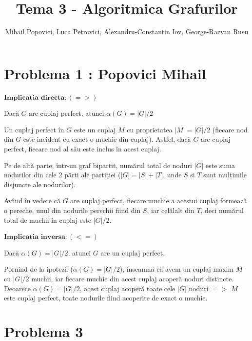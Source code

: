 \documentclass{article}
\title{Tema 3 - Algoritmica Grafurilor}
\author{Mihail Popovici, Luca Petrovici, Alexandru-Constantin Iov, George-Razvan Rusu}
\begin{document}
\maketitle

\section*{\fontsize{20}{50}\selectfont Problema 1 : Popovici Mihail}

{\fontsize{14}{16}\selectfont 
$\mathbf{Implicatia}$ $\mathbf{directa: (=>)}$ 
\par Dacă $G$ are cuplaj perfect, atunci $\alpha(G) = |G|/2$
\\
\par Un cuplaj perfect în $G$ este un cuplaj $M$ cu proprietatea $|M| = |G|/2$ (fiecare nod din $G$ este incident cu exact o muchie din cuplaj). Astfel, dacă $G$ are cuplaj perfect, fiecare nod al său este inclus în acest cuplaj. 
\par Pe de altă parte, într-un graf bipartit, numărul total de noduri $|G|$ este suma nodurilor din cele 2 părți ale partiției ($|G| = |S| + |T|$, unde $S$ și $T$ sunt mulțimile disjuncte ale nodurilor).
\par Având în vedere că $G$ are cuplaj perfect, fiecare muchie a acestui cuplaj formează o pereche, unul din nodurile perechii fiind din $S$, iar celălalt din $T$, deci numărul total de muchii în cuplaj este $|G|/2$.

\bigskip
$\mathbf{Implicatia}$ $\mathbf{inversa: (<=)}$ 
\par Dacă $\alpha(G) = |G|/2$, atunci $G$ are un cuplaj perfect.
\\

\par Pornind de la ipoteză ($\alpha(G) = |G|/2$), înseamnă că avem un cuplaj maxim $M$ cu $|G|/2$ muchii, iar fiecare muchie din acest cuplaj acoperă noduri distincte. Deoarece $\alpha(G) = |G|/2$, acest cuplaj acoperă toate cele $|G|$ noduri $=>$ $M$ este cuplaj perfect, toate nodurile fiind acoperite de exact o muchie. 

}

\section*{\fontsize{20}{50}\selectfont Problema 3}
\end{document}
